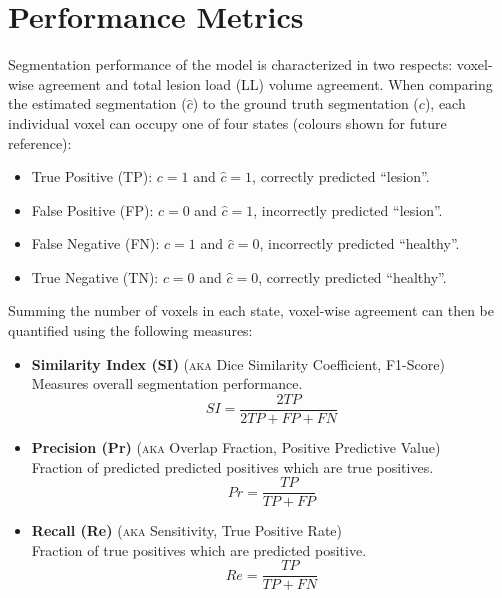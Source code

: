 \section{Performance Metrics}
\label{ss:metrics}
Segmentation performance of the model is characterized in two respects: voxel-wise agreement and total lesion load (LL) volume agreement. 
When comparing the estimated segmentation ($\hat{c}$) to the ground truth segmentation ($c$), each individual voxel can occupy one of four states (colours shown for future reference):
\begin{itemize}[itemsep=0pt]
  \item[\textcolor{green}{\scalebox{0.7}{$\blacksquare$}}] True Positive (TP): $c = 1$ and $\hat{c} = 1$, correctly predicted ``lesion''.
  \item[\textcolor{red}  {\scalebox{0.7}{$\blacksquare$}}] False Positive (FP): $c = 0$ and $\hat{c} = 1$, incorrectly predicted ``lesion''.
  \item[\textcolor{blue} {\scalebox{0.7}{$\blacksquare$}}] False Negative (FN): $c = 1$ and $\hat{c} = 0$, incorrectly predicted ``healthy''.
  \item[\textcolor{black}{\scalebox{0.7}{$\blacksquare$}}] True Negative (TN): $c = 0$ and $\hat{c} = 0$, correctly predicted ``healthy''.
\end{itemize}
Summing the number of voxels in each state, voxel-wise agreement can then be quantified using the following measures:
\begin{itemize}
  \item \textbf{Similarity Index (SI)} (\textsc{aka} Dice Similarity Coefficient, F1-Score)\\Measures overall segmentation performance.
  \begin{equation}SI = \dfrac{2TP}{2TP + FP + FN}\end{equation}
  \item \textbf{Precision (Pr)} (\textsc{aka} Overlap Fraction, Positive Predictive Value)\\Fraction of predicted predicted positives which are true positives.
  \begin{equation}Pr = \dfrac{TP}{TP+FP}\end{equation}
  \item \textbf{Recall (Re)} (\textsc{aka} Sensitivity, True Positive Rate)\\Fraction of true positives which are predicted positive.
  \begin{equation}Re = \dfrac{TP}{TP+FN}\end{equation}
\end{itemize}
